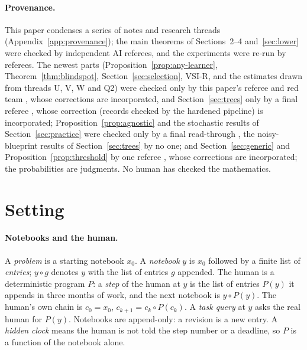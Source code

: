 \documentclass[11pt]{article}
\theoremstyle{definition}
\theoremstyle{remark}
\begin{document}
\paragraph{Provenance.} This paper condenses a series of notes and research threads (Appendix~\ref{app:provenance}); the main theorems of Sections~2--4 and~\ref{sec:lower} were checked by independent AI referees, and the experiments were re-run by referees. The newest parts (Proposition~\ref{prop:any-learner}, Theorem~\ref{thm:blindspot}, Section~\ref{sec:selection}, VSI-R, and the estimates drawn from threads U, V, W and Q2) were checked only by this paper's referee and red team \cite{referee9,redteam3}, whose corrections are incorporated, and Section~\ref{sec:trees} only by a final referee \cite{referee10}, whose correction (records checked by the hardened pipeline) is incorporated; Proposition~\ref{prop:agnostic} and the stochastic results of Section~\ref{sec:practice} \cite{threadZ} were checked only by a final read-through \cite{readthrough}, the noisy-blueprint results of Section~\ref{sec:trees} \cite{threadAA} by no one; and Section~\ref{sec:generic} and Proposition~\ref{prop:threshold} by one referee \cite{referee11}, whose corrections are incorporated; the probabilities are judgments. No human has checked the mathematics.

\section{Setting}\label{sec:setting}

\paragraph{Notebooks and the human.} A \emph{problem} is a starting notebook $x_0$. A \emph{notebook} $y$ is $x_0$ followed by a finite list of \emph{entries}; $y \circ g$ denotes $y$ with the list of entries $g$ appended. The human is a deterministic program $P$: a \emph{step} of the human at $y$ is the list of entries $P(y)$ it appends in three months of work, and the next notebook is $y\circ P(y)$. The human's own chain is $c_0 = x_0$, $c_{k+1} = c_k\circ P(c_k)$. A \emph{task query} at $y$ asks the real human for $P(y)$. Notebooks are append-only: a revision is a new entry. A \emph{hidden clock} means the human is not told the step number or a deadline, so $P$ is a function of the notebook alone.
\end{document}
